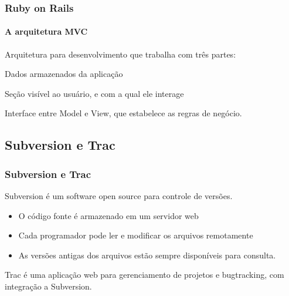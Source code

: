 \documentclass[11pt]{beamer}
\def\gap{\vspace{0.1in}}
\begin{document}
	\begin{frame}
		\frametitle{Ruby on Rails}
		\framesubtitle{A arquitetura MVC}
		\begin{description}
		\item Arquitetura para desenvolvimento que trabalha com três partes:
		\item[Model] Dados armazenados da aplicação
		\item[View] Seção visível ao usuário, e com a qual ele interage
		\item[Controller] Interface entre Model e View, que estabelece as regras de negócio.
		\end{description}
	\end{frame}
%

	\subsection{Subversion e Trac}
	\begin{frame}
		\frametitle{Subversion e Trac}
		Subversion é um software open source para controle de versões.
		\begin{itemize}
			\item O código fonte é armazenado em um servidor web
			\item Cada programador pode ler e modificar os arquivos remotamente
			\item As versões antigas dos arquivos estão sempre disponíveis para
			consulta.
		\end{itemize}

		\gap
		Trac é uma aplicação web para gerenciamento de projetos e bugtracking,
		com integração a Subversion.
	\end{frame}
\end{document}
